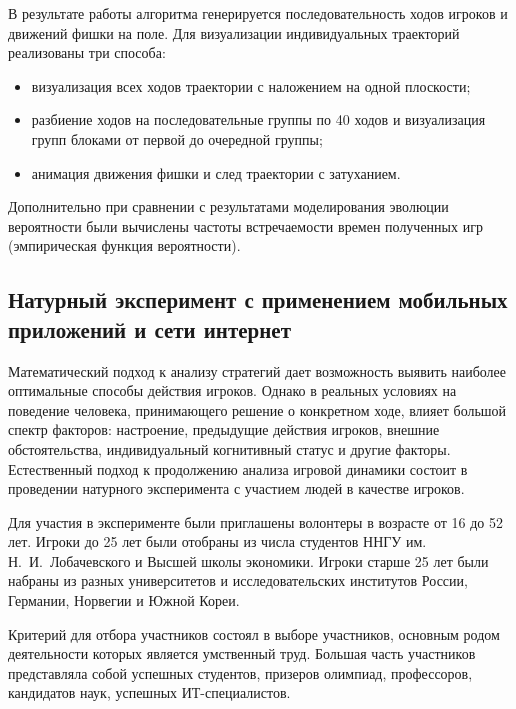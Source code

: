 В результате работы алгоритма генерируется последовательность ходов игроков и движений фишки на поле. Для визуализации индивидуальных траекторий реализованы три способа: 
\begin{itemize}
\item визуализация всех ходов траектории с наложением на одной плоскости;
\item разбиение ходов на последовательные группы по 40 ходов и визуализация групп блоками от первой до очередной группы;
\item анимация движения фишки и след траектории с затуханием.
\end{itemize}

Дополнительно при сравнении с результатами моделирования эволюции вероятности были вычислены частоты встречаемости времен полученных игр (эмпирическая функция вероятности). 

\subsection{Натурный эксперимент с применением мобильных приложений и сети интернет}\label{subsec:ch3/sec2/sub3}

Математический подход к анализу стратегий дает возможность выявить наиболее оптимальные способы действия игроков. Однако в реальных условиях на поведение человека, принимающего решение о конкретном ходе, влияет большой спектр факторов: настроение, предыдущие действия игроков, внешние обстоятельства, индивидуальный когнитивный статус и другие факторы. Естественный подход к продолжению анализа игровой динамики состоит в проведении натурного эксперимента с участием людей в качестве игроков. 

Для участия в эксперименте были приглашены волонтеры в возрасте от 16 до 52 лет. Игроки до 25 лет были отобраны из числа студентов ННГУ им. Н.~И.~Лобачевского и Высшей школы экономики. Игроки старше 25 лет были набраны из разных университетов и исследовательских институтов России, Германии, Норвегии и Южной Кореи.

Критерий для отбора участников состоял в выборе участников, основным родом деятельности которых является умственный труд. Большая часть участников представляла собой успешных студентов, призеров олимпиад, профессоров, кандидатов наук, успешных ИТ-специалистов.



